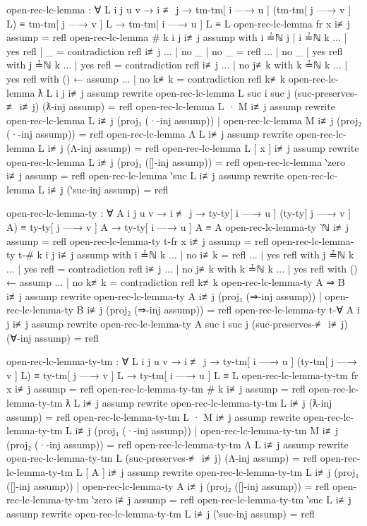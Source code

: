 \documentclass[logo,bsc,singlespacing,parskip,online]{infthesis}
\renewenvironment{code}{\mintedcopy[breaklines,breaksymbolleft=\;]{agda}}{\endmintedcopy}
\begin{document}
\begin{code}
  open-rec-lc-lemma : ∀ {L i j u v}
    → i ≢ j
    → tm-tm[ i —→ u ] (tm-tm[ j —→ v ] L) ≡ tm-tm[ j —→ v ] L
    → tm-tm[ i —→ u ] L ≡ L
  open-rec-lc-lemma {fr x} i≢j assump = refl
  open-rec-lc-lemma {# k} {i} {j} i≢j assump
    with i ≟ℕ j | i ≟ℕ k
  ... | yes refl | _ = contradiction refl i≢j
  ... | no _     | no _ = refl
  ... | no _     | yes refl with j ≟ℕ k
  ...   | yes refl = contradiction refl i≢j
  ...   | no j≢k with k ≟ℕ k
  ...     | yes refl with () ← assump
  ...     | no  k≢k  = contradiction refl k≢k
  open-rec-lc-lemma {ƛ L} {i} {j} i≢j assump
    rewrite open-rec-lc-lemma {L} {suc i} {suc j}
      (suc-preserves-≢ i≢j)
      (ƛ-inj assump)
    = refl
  open-rec-lc-lemma {L · M} i≢j assump rewrite
      open-rec-lc-lemma {L} i≢j (proj₁ (·-inj assump))
    | open-rec-lc-lemma {M} i≢j (proj₂ (·-inj assump))
    = refl
  open-rec-lc-lemma {Λ L} i≢j assump
    rewrite open-rec-lc-lemma {L} i≢j (Λ-inj assump) = refl
  open-rec-lc-lemma {L [ x ]} i≢j assump
    rewrite open-rec-lc-lemma {L} i≢j (proj₁ ([]-inj assump)) = refl
  open-rec-lc-lemma {‵zero} i≢j assump = refl
  open-rec-lc-lemma {‵suc L} i≢j assump
    rewrite open-rec-lc-lemma {L} i≢j (‵suc-inj assump) = refl

  
  open-rec-lc-lemma-ty : ∀ {A i j u v}
    → i ≢ j
    → ty-ty[ i —→ u ] (ty-ty[ j —→ v ] A) ≡ ty-ty[ j —→ v ] A
    → ty-ty[ i —→ u ] A ≡ A
  open-rec-lc-lemma-ty {‵ℕ} i≢j assump = refl
  open-rec-lc-lemma-ty {t-fr x} i≢j assump = refl
  open-rec-lc-lemma-ty {t-# k} {i} {j} i≢j assump with i ≟ℕ k
  ... | no  i≢k  = refl
  ... | yes refl with j ≟ℕ k
  ...   | yes refl = contradiction refl i≢j
  ...   | no  j≢k with k ≟ℕ k
  ...     | yes refl with () ← assump
  ...     | no  k≢k = contradiction refl k≢k
  open-rec-lc-lemma-ty {A ⇒ B} i≢j assump rewrite
      open-rec-lc-lemma-ty {A} i≢j (proj₁ (⇒-inj assump))
    | open-rec-lc-lemma-ty {B} i≢j (proj₂ (⇒-inj assump))
    = refl
  open-rec-lc-lemma-ty {t-∀ A} {i} {j} i≢j assump
    rewrite open-rec-lc-lemma-ty {A} {suc i} {suc j}
      (suc-preserves-≢ i≢j)
      (∀-inj assump)
        = refl

  open-rec-lc-lemma-ty-tm : ∀ {L i j u v}
    → i ≢ j
    → ty-tm[ i —→ u ] (ty-tm[ j —→ v ] L) ≡ ty-tm[ j —→ v ] L
    → ty-tm[ i —→ u ] L ≡ L
  open-rec-lc-lemma-ty-tm {fr x} i≢j assump = refl
  open-rec-lc-lemma-ty-tm {# k} i≢j assump = refl
  open-rec-lc-lemma-ty-tm {ƛ L} i≢j assump rewrite
    open-rec-lc-lemma-ty-tm {L} i≢j (ƛ-inj assump) = refl
  open-rec-lc-lemma-ty-tm {L · M} i≢j assump rewrite
      open-rec-lc-lemma-ty-tm {L} i≢j (proj₁ (·-inj assump))
    | open-rec-lc-lemma-ty-tm {M} i≢j (proj₂ (·-inj assump)) = refl
  open-rec-lc-lemma-ty-tm {Λ L} i≢j assump rewrite
    open-rec-lc-lemma-ty-tm {L} (suc-preserves-≢ i≢j) (Λ-inj assump) = refl
  open-rec-lc-lemma-ty-tm {L [ A ]} i≢j assump rewrite
      open-rec-lc-lemma-ty-tm {L} i≢j (proj₁ ([]-inj assump))
    | open-rec-lc-lemma-ty {A} i≢j (proj₂ ([]-inj assump)) = refl
  open-rec-lc-lemma-ty-tm {‵zero} i≢j assump = refl
  open-rec-lc-lemma-ty-tm {‵suc L} i≢j assump rewrite
    open-rec-lc-lemma-ty-tm {L} i≢j (‵suc-inj assump) = refl


\end{code}
\end{document}

